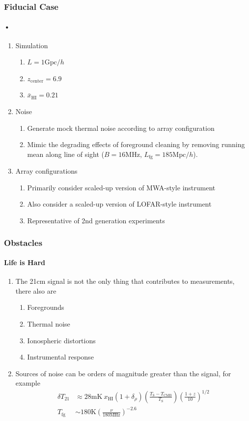 \documentclass{beamer}
\begin{document}
\begin{frame}
\frametitle{Fiducial Case}
\framesubtitle{•}
\begin{enumerate}[-]
\item Simulation
\begin{enumerate}[$\to$]
\item $L = 1\text{Gpc}/h$
\item $z_{\text{center}} = 6.9$
\item $\bar{x}_{\text{HI}} = 0.21$
\end{enumerate}
\item Noise
\begin{enumerate}[$\to$]
\item Generate mock thermal noise according to array configuration
\item Mimic the degrading effects of foreground cleaning by removing running mean along line of sight ($B = 16\text{MHz}$, $L_{\text{fg}} = 185\text{Mpc}/h$).
\end{enumerate}
\item Array configurations
\begin{enumerate}[$\to$]
\item Primarily consider scaled-up version of MWA-style instrument
\item Also consider a scaled-up version of LOFAR-style instrument
\item Representative of 2nd generation experiments
\end{enumerate}
\end{enumerate}
\end{frame}

\begin{frame}
\frametitle{Obstacles}
\framesubtitle{Life is Hard}
\begin{enumerate}[-]
\item The 21cm signal is not the only thing that contributes to measurements, there also are
\begin{enumerate}[$\to$]
\item Foregrounds
\item Thermal noise
\item Ionospheric distortions
\item Instrumental response
\end{enumerate}
\item Sources of noise can be orders of magnitude greater than the signal, for example
\begin{align*}
\delta T_{21} &\approx 28\text{mK}\ x_{\text{HI}} (1+\delta_{\rho})\left( \frac{T_{\text{S}}-T_{\text{CMB}}}{T_{\text{S}}} \right)\left( \frac{1+z}{10} \right)^{1/2} \\
T_{\text{fg}} &\sim 180\text{K} \left( \frac{\nu}{180\text{MHz}} \right)^{-2.6} \tag{Cold FOV}
\end{align*}
\end{enumerate}
\end{frame}
\end{document}
